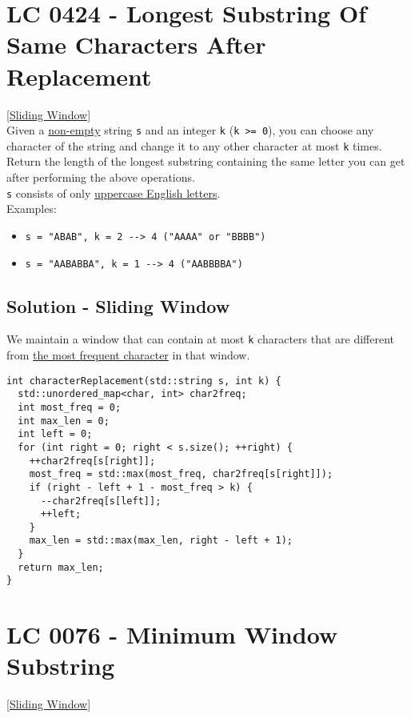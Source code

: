 {\section{LC 0424 - Longest Substring Of Same Characters After Replacement}\label{lc0424}
{\hyperref[sec:sliding_window]{[Sliding Window]}}\\

Given a \ul{non-empty} string {\colorbox{CodeBackground}{\lstinline|s|}} and an integer {\colorbox{CodeBackground}{\lstinline|k|}} ({\colorbox{CodeBackground}{\lstinline|k >= 0|}}), you can choose any character of the string and change it to any other character at most {\colorbox{CodeBackground}{\lstinline|k|}} times. Return the length of the longest substring containing the same letter you can get after performing the above operations.\\

{\colorbox{CodeBackground}{\lstinline|s|}} consists of only \ul{uppercase English letters}.\\

Examples:
\begin{itemize}
\item {\colorbox{CodeBackground}{\lstinline|s = "ABAB", k = 2 --> 4 ("AAAA" or "BBBB")|}}
\item {\colorbox{CodeBackground}{\lstinline|s = "AABABBA", k = 1 --> 4 ("AABBBBA")|}}
\end{itemize}

\subsection*{Solution - Sliding Window}
We maintain a window that can contain at most {\colorbox{CodeBackground}{\lstinline|k|}} characters that are different from \ul{the most frequent character} in that window.
\begin{lstlisting}
int characterReplacement(std::string s, int k) {
  std::unordered_map<char, int> char2freq;
  int most_freq = 0;
  int max_len = 0;
  int left = 0;
  for (int right = 0; right < s.size(); ++right) {
    ++char2freq[s[right]];
    most_freq = std::max(most_freq, char2freq[s[right]]);
    if (right - left + 1 - most_freq > k) {
      --char2freq[s[left]];
      ++left;
    }
    max_len = std::max(max_len, right - left + 1);
  }
  return max_len;
}
\end{lstlisting}

\section{LC 0076 - Minimum Window Substring}\label{lc0076}
{\hyperref[sec:sliding_window]{[Sliding Window]}}\\

}
